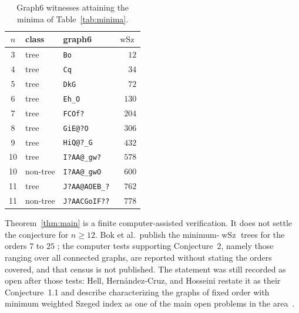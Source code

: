 \documentclass[11pt]{amsart}
\newcommand{\wSz}{\operatorname{wSz}}
\begin{document}
\begin{table}[ht]
\centering
\small
\caption{Graph6 witnesses attaining the minima of
Table~\ref{tab:minima}.}
\label{tab:witnesses}
\begin{tabular}{@{}cllr@{}}
\toprule
$n$ & class & graph6 & $\wSz$ \\
\midrule
3  & tree     & \texttt{Bo}           & $12$  \\
4  & tree     & \texttt{Cq}           & $34$  \\
5  & tree     & \texttt{DkG}          & $72$  \\
6  & tree     & \texttt{Eh\_O}        & $130$ \\
7  & tree     & \texttt{FCOf?}        & $204$ \\
8  & tree     & \texttt{GiE@?O}       & $306$ \\
9  & tree     & \texttt{HiQ@?\_G}     & $432$ \\
10 & tree     & \texttt{I?AA@\_gw?}   & $578$ \\
10 & non-tree & \texttt{I?AA@\_gwO}   & $600$ \\
11 & tree     & \texttt{J?AA@AOEB\_?} & $762$ \\
11 & non-tree & \texttt{J?AACGoIF??}  & $778$ \\
\bottomrule
\end{tabular}
\end{table}

Theorem~\ref{thm:main} is a finite computer-assisted verification. It
does not settle the conjecture for $n\ge 12$. Bok et al.\ publish the
minimum-$\wSz$ trees for the orders $7$ to $25$
\cite[Table~1]{BokEtAl2019}; the computer tests supporting
Conjecture~2, namely those ranging over all connected graphs, are
reported without stating the orders covered, and that census is not
published. The statement was still recorded as open after those tests:
Hell, Hern\'andez-Cruz, and Hosseini restate it as their
Conjecture~1.1 and describe characterizing the graphs of fixed order
with minimum weighted Szeged index as one of the main open problems in
the area~\cite{HellEtAl2024}.

\medskip
\end{document}
